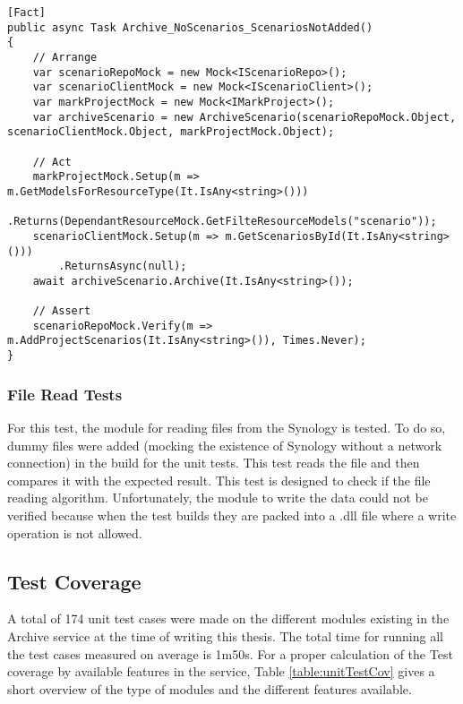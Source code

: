 \begin{lstlisting}[language={[Sharp]C}, caption={No scenarios added if resource empty}, captionpos=b,label={lst:scenarisEmpty}]
[Fact]
public async Task Archive_NoScenarios_ScenariosNotAdded()
{
    // Arrange
    var scenarioRepoMock = new Mock<IScenarioRepo>();
    var scenarioClientMock = new Mock<IScenarioClient>();
    var markProjectMock = new Mock<IMarkProject>();
    var archiveScenario = new ArchiveScenario(scenarioRepoMock.Object, scenarioClientMock.Object, markProjectMock.Object);
    
    // Act
    markProjectMock.Setup(m => m.GetModelsForResourceType(It.IsAny<string>()))
        .Returns(DependantResourceMock.GetFilteResourceModels("scenario"));
    scenarioClientMock.Setup(m => m.GetScenariosById(It.IsAny<string>()))
        .ReturnsAsync(null);
    await archiveScenario.Archive(It.IsAny<string>());                
    
    // Assert
    scenarioRepoMock.Verify(m => m.AddProjectScenarios(It.IsAny<string>()), Times.Never);
}
\end{lstlisting}

\subsubsection{File Read Tests}
For this test, the module for reading files from the Synology is tested. To do so, dummy files were added (mocking the existence of Synology without 
a network connection) in the build for the unit tests. This test reads the file
and then compares it with the expected result. This test is designed to check if the file reading algorithm. Unfortunately, the module to write the data
could not be verified because when the test builds they are packed into a .dll file where a write operation is not allowed.

\subsection{Test Coverage}
A total of 174 unit test cases were made on the different modules existing in the Archive service at the time of writing this thesis. The total time for running all 
the test cases measured on average is 1m50s. For a proper calculation of the Test coverage by available features in the service, Table \ref{table:unitTestCov} gives a short
overview of the type of modules and the different features available.

